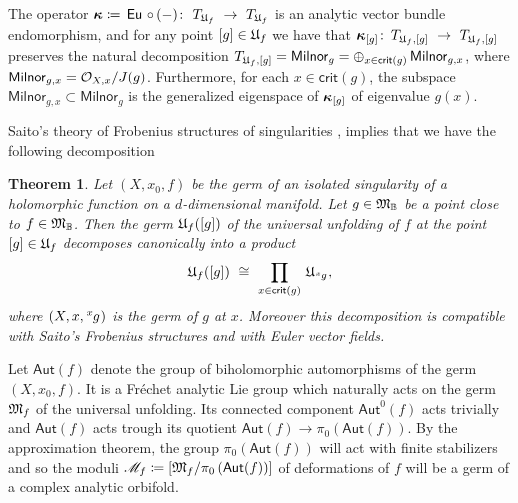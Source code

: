 \documentclass[twoside,leqno]{article}
\numberwithin{equation}{section}
\theoremstyle{plain}
\newtheorem{theorem}[equation]{Theorem}
\theoremstyle{definition}
\begin{document}
The operator $\boldsymbol{\kappa} \coloneqq \, \operatorname{\mathsf{Eu}}\, \circ \, (-) \colon \ T_{\mathfrak{U}_{f}} \ \to \ T_{\mathfrak{U}_{f}}$ 
is an analytic vector bundle endomorphism, and for any point $[g] \in \mathfrak{U}_{f}$ we have that 
$\bkappa_{[g]} \colon \, T_{\univ_{f},[g]} \ \to \ T_{\univ_{f},[g]}$ preserves the natural  decomposition $T_{\mathfrak{U}_{f},[g]} = \mathsf{Milnor}_{g} =  \oplus_{x \in \mathsf{crit}(g)} \, \mathsf{Milnor}_{g,x}$, where $\mathsf{Milnor}_{g,x} = \mathcal O_{X,x}/J(g)$. Furthermore, for each $x \in \mathsf{crit}(g)$, the subspace 
$\mathsf{Milnor}_{g,x} \subset \mathsf{Milnor}_{g}$ is the generalized eigenspace of $\boldsymbol{\kappa}_{[g]}$ of eigenvalue $g(x)$. 


\medskip

Saito's theory of Frobenius structures of singularities \cite{KyojiSaito-residue}, \cite[Chapter~VI]{Sabbah-Isomonodromic} implies that we have the following decomposition

\begin{theorem} \label{theo:decompsing} 
Let $(X,x_{0},f)$ be the germ of an isolated singularity of a holomorphic function on a $d$-dimensional manifold. Let $g \in \mathfrak{M}_{\mathbb{B}}$ be a point close to $f \in \mathfrak{M}_{\mathbb{B}}$. Then the germ $\mathfrak{U}_{f}([g])$ of the universal unfolding of $f$ at the point $[g] \in \mathfrak{U}_{f}$ decomposes canonically into a product 
\[
\univ_{f}([g]) \ \cong \ \prod_{x \in \mathsf{crit}(g)} \, \univ_{{\tensor[^x]{g}{}}},
\]
where $(X,x,{\tensor[^x]{g}{}})$ is the germ of $g$ at $x$. Moreover this decomposition is compatible with Saito's Frobenius structures and with Euler vector fields.
\end{theorem}

Let $\mathsf{Aut}(f)$ denote the group of biholomorphic automorphisms of the germ $(X,x_{0},f)$. It is a Fr\'{e}chet analytic Lie group which naturally acts on the germ $\mathfrak{M}_{f}$ of the universal unfolding.  Its connected component $\mathsf{Aut}^{0}(f)$ acts 
trivially and $\mathsf{Aut}(f)$ acts trough its quotient $\mathsf{Aut}(f) \to \pi_{0}\left( 
\mathsf{Aut}(f)\right)$. By the approximation theorem, the group $\pi_{0}\left( 
\mathsf{Aut}(f)\right)$ will act with finite stabilizers and so 
the moduli $\mathscr{M}_{f} \coloneqq \left[\mathfrak{M}_{f}/\pi_{0}\left( 
\mathsf{Aut}(f)\right)\right]$ of deformations of $f$ will be a germ of a complex analytic orbifold.
\end{document}
